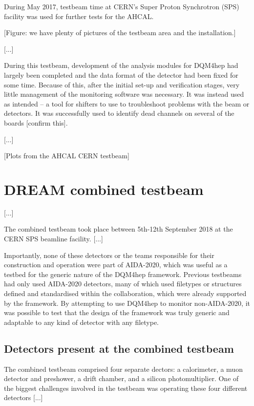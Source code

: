 During May 2017, testbeam time at CERN's Super Proton Synchrotron (SPS) facility was used for further tests for the AHCAL.

\begin{center}
	[Figure: we have plenty of pictures of the testbeam area and the installation.]
\end{center}

[...]

During this testbeam, development of the analysis modules for DQM4hep had largely been completed and the data format of the detector had been fixed for some time. Because of this, after the initial set-up and verification stages, very little management of the monitoring software was necessary. It was instead used as intended -- a tool for shifters to use to troubleshoot problems with the beam or detectors. It was successfully used to identify dead channels on several of the boards [confirm this].

[...]

\begin{center}
	[Plots from the AHCAL CERN testbeam]
\end{center}

\section{DREAM combined testbeam}
[...]

The combined testbeam took place between 5th-12th September 2018 at the CERN SPS beamline facility. [...]

Importantly, none of these detectors or the teams responsible for their construction and operation were part of AIDA-2020, which was useful as a testbed for the generic nature of the DQM4hep framework. Previous testbeams had only used AIDA-2020 detectors, many of which used filetypes or structures defined and standardised within the collaboration, which were already supported by the framework. By attempting to use DQM4hep to monitor non-AIDA-2020, it was possible to test that the design of the framework was truly generic and adaptable to any kind of detector with any filetype.

\subsection{Detectors present at the combined testbeam}
The combined testbeam comprised four separate dectors: a calorimeter, a muon detector and preshower, a drift chamber, and a silicon photomultiplier. One of the biggest challenges involved in the testbeam was operating these four different detectors [...]

